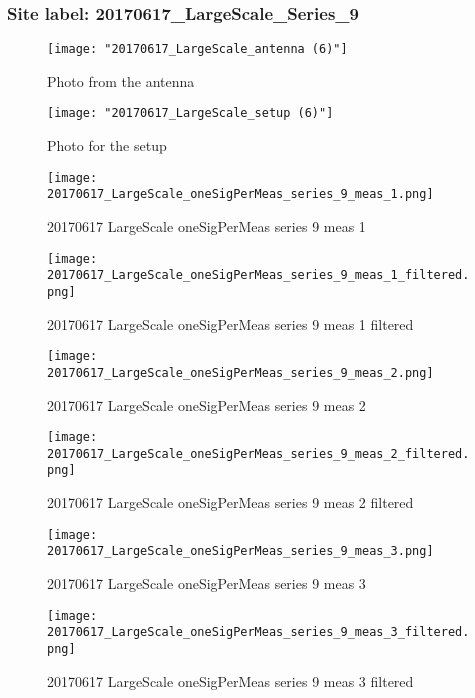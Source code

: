 \subsubsection{Site label: 20170617\_LargeScale\_Series\_9}
\begin{figure}[ht] \caption{Photo from the antenna}
\texttt{[image: "20170617\_LargeScale\_antenna (6)"]}\centering\end{figure}
\begin{figure}[ht] \caption{Photo for the setup}
\texttt{[image: "20170617\_LargeScale\_setup (6)"]}\centering\end{figure}
\begin{figure}[ht] \caption{20170617 LargeScale oneSigPerMeas series 9 meas 1}
\texttt{[image: 20170617\_LargeScale\_oneSigPerMeas\_series\_9\_meas\_1.png]}\centering\end{figure}
\begin{figure}[ht] \caption{20170617 LargeScale oneSigPerMeas series 9 meas 1 filtered}
\texttt{[image: 20170617\_LargeScale\_oneSigPerMeas\_series\_9\_meas\_1\_filtered.png]}\centering\end{figure}
\begin{figure}[ht] \caption{20170617 LargeScale oneSigPerMeas series 9 meas 2}
\texttt{[image: 20170617\_LargeScale\_oneSigPerMeas\_series\_9\_meas\_2.png]}\centering\end{figure}
\begin{figure}[ht] \caption{20170617 LargeScale oneSigPerMeas series 9 meas 2 filtered}
\texttt{[image: 20170617\_LargeScale\_oneSigPerMeas\_series\_9\_meas\_2\_filtered.png]}\centering\end{figure}
\begin{figure}[ht] \caption{20170617 LargeScale oneSigPerMeas series 9 meas 3}
\texttt{[image: 20170617\_LargeScale\_oneSigPerMeas\_series\_9\_meas\_3.png]}\centering\end{figure}
\begin{figure}[ht] \caption{20170617 LargeScale oneSigPerMeas series 9 meas 3 filtered}
\texttt{[image: 20170617\_LargeScale\_oneSigPerMeas\_series\_9\_meas\_3\_filtered.png]}\centering\end{figure}
\clearpage
